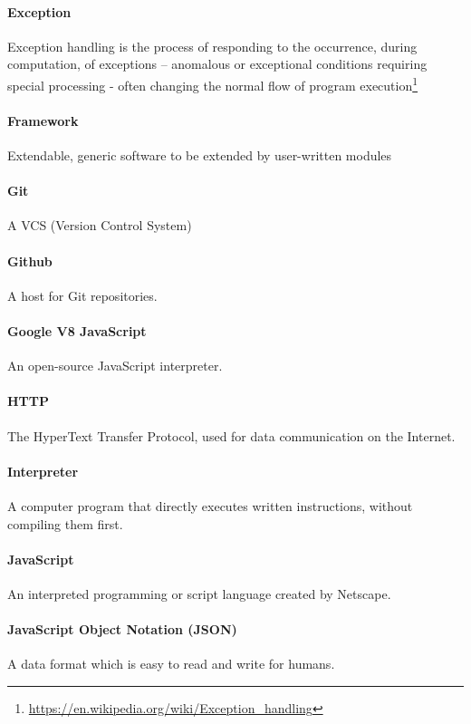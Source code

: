 \paragraph{Exception}
Exception handling is the process of responding to the occurrence, during computation, of exceptions – anomalous or exceptional conditions requiring special processing - often changing the normal flow of program execution\footnote{\url{https://en.wikipedia.org/wiki/Exception_handling}}

\paragraph{Framework}
Extendable, generic software to be extended by user-written modules

\paragraph{Git}
A VCS (Version Control System)

\paragraph{Github}
A host for Git repositories.

\paragraph{Google V8 JavaScript}
An open-source JavaScript interpreter.

\paragraph{HTTP}
The HyperText Transfer Protocol, used for data communication on the Internet.

\paragraph{Interpreter}
A computer program that directly executes written instructions, without compiling them first.

\paragraph{JavaScript}
An interpreted programming or script language created by Netscape.

\paragraph{JavaScript Object Notation (JSON)}
A data format which is easy to read and write for humans.

